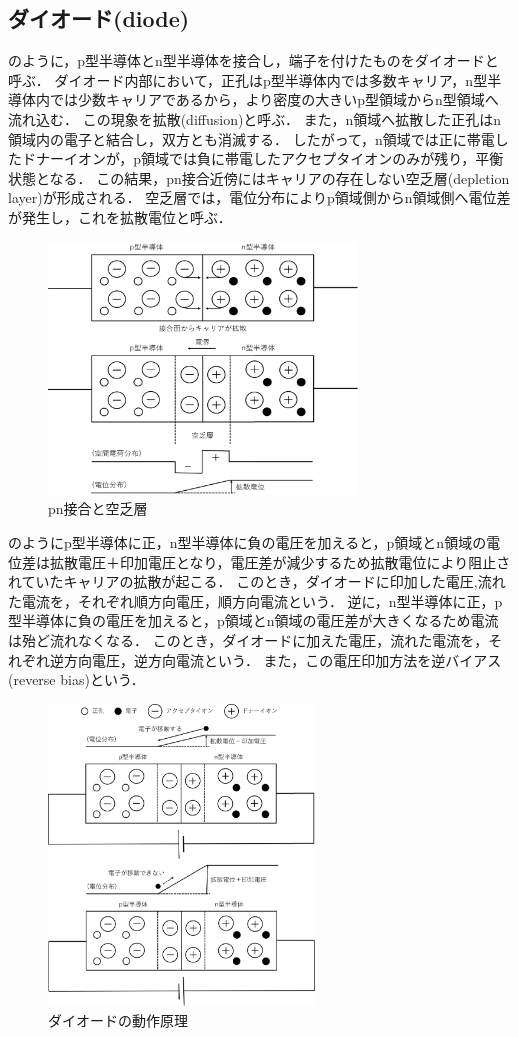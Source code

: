 \subsection{ダイオード(diode)}
のように，p型半導体とn型半導体を接合し，端子を付けたものをダイオードと呼ぶ．
ダイオード内部において，正孔はp型半導体内では多数キャリア，n型半導体内では少数キャリアであるから，より密度の大きいp型領域からn型領域へ流れ込む．
この現象を拡散(diffusion)と呼ぶ．
また，n領域へ拡散した正孔はn領域内の電子と結合し，双方とも消滅する．
したがって，n領域では正に帯電したドナーイオンが，p領域では負に帯電したアクセプタイオンのみが残り，平衡状態となる．
この結果，pn接合近傍にはキャリアの存在しない空乏層(depletion layer)が形成される．
空乏層では，電位分布によりp領域側からn領域側へ電位差が発生し，これを拡散電位と呼ぶ．

\begin{figure}[!h]
 \centering
 \includegraphics[width=8.2cm]{./fig/fig1.eps}
 \caption{pn接合と空乏層}
 \label{fig:fig1}
\end{figure}%

のようにp型半導体に正，n型半導体に負の電圧を加えると，p領域とn領域の電位差は拡散電圧＋印加電圧となり，電圧差が減少するため拡散電位により阻止されていたキャリアの拡散が起こる．
このとき，ダイオードに印加した電圧,流れた電流を，それぞれ順方向電圧，順方向電流という．
逆に，n型半導体に正，p型半導体に負の電圧を加えると，p領域とn領域の電圧差が大きくなるため電流は殆ど流れなくなる．
このとき，ダイオードに加えた電圧，流れた電流を，それぞれ逆方向電圧，逆方向電流という．
また，この電圧印加方法を逆バイアス(reverse bias)という．

\begin{figure}[!t]
 \centering
 \includegraphics[height=8.0cm]{./fig/fig2.eps}
 \caption{ダイオードの動作原理}
 \label{fig:fig2}
\end{figure}%

